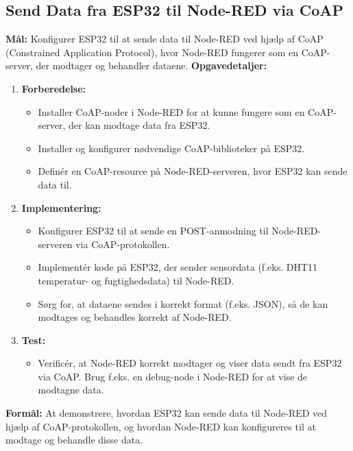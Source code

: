 \documentclass[12pt,a4paper]{book}
\begin{document}
	\subsection*{Send Data fra ESP32 til Node-RED via CoAP}
	\textbf{Mål:} Konfigurer ESP32 til at sende data til Node-RED ved hjælp af CoAP (Constrained Application Protocol), hvor Node-RED fungerer som en CoAP-server, der modtager og behandler dataene.
	\newline\newline\noindent
	\textbf{Opgavedetaljer:}
	\begin{enumerate}
		\item \textbf{Forberedelse:}
		\begin{itemize}
			\item Installer CoAP-noder i Node-RED for at kunne fungere som en CoAP-server, der kan modtage data fra ESP32.
			\item Installer og konfigurer nødvendige CoAP-biblioteker på ESP32.
			\item Definér en CoAP-resource på Node-RED-serveren, hvor ESP32 kan sende data til.
		\end{itemize}
		\item \textbf{Implementering:}
		\begin{itemize}
			\item Konfigurer ESP32 til at sende en POST-anmodning til Node-RED-serveren via CoAP-protokollen.
			\item Implementér kode på ESP32, der sender sensordata (f.eks. DHT11 temperatur- og fugtighedsdata) til Node-RED.
			\item Sørg for, at dataene sendes i korrekt format (f.eks. JSON), så de kan modtages og behandles korrekt af Node-RED.
		\end{itemize}
		\item \textbf{Test:}
		\begin{itemize}
			\item Verificér, at Node-RED korrekt modtager og viser data sendt fra ESP32 via CoAP. Brug f.eks. en debug-node i Node-RED for at vise de modtagne data.
		\end{itemize}
	\end{enumerate}
	\textbf{Formål:} At demonstrere, hvordan ESP32 kan sende data til Node-RED ved hjælp af CoAP-protokollen, og hvordan Node-RED kan konfigureres til at modtage og behandle disse data.
	
\end{document}

